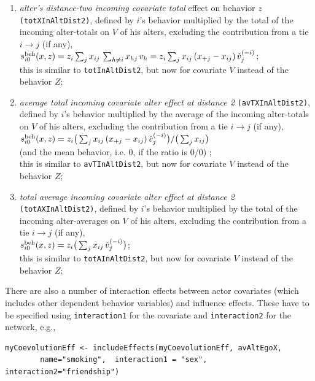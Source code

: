 \documentclass[a4paper,fleqn,11pt]{article}
\newcommand{\+}{\, + \,}
\newcommand{\vit}{\theenumi}
\newcounter{savenumi}
\begin{document}
\begin{enumerate}
 \item {\em alter's distance-two incoming covariate total} effect on behavior $z$ \texttt{(totXInAltDist2)},
 defined by  $i$'s
 behavior multiplied by the total of the incoming alter-totals on $V$ of his alters,
 excluding the contribution from a tie $i \rightarrow j$ (if any),\\
 $s^{\rm beh}_{i\vit}(x, z) = z_i \sum_j x_{ij}\, \sum_{h \neq i} x_{hj}\,v_h =
         z_i \sum_j x_{ij}\, (x_{+j}- x_{ij}) \, \check v_j^{(-i)}  $;\\[0.5ex]
 this is similar to \texttt{totInAltDist2}, but now for covariate $V$
 instead of the behavior $Z$;

 \item {\em average total incoming covariate alter effect at distance 2} \texttt{(avTXInAltDist2)},
 defined by  $i$'s
 behavior multiplied by the average of the incoming alter-totals on $V$ of his alters,
 excluding the contribution from a tie $i \rightarrow j$ (if any),\\[0.3ex]
 $s^{\rm beh}_{i\vit}(x, z) =  z_i \big( \sum_j x_{ij}\,(x_{+j}- x_{ij}) \, \check v_j^{(-i)} \big)
                                / \big (\sum_j x_{ij}\big)  $\\[0.5ex]
 (and the mean behavior, i.e. $0$, if the ratio is 0/0) ;\\
 this is similar to \texttt{avTInAltDist2}, but now for covariate $V$
 instead of the behavior $Z$;

 \item {\em total average incoming covariate alter effect at distance 2} \texttt{(totAXInAltDist2)},
 defined by  $i$'s
 behavior multiplied by the total of the incoming alter-averages on $V$ of his alters,
 excluding the contribution from a tie $i \rightarrow j$ (if any), \\[0.3ex]
 $s^{\rm beh}_{i\vit}(x, z) =  z_i \big( \sum_j x_{ij}\, \check v_j^{(-i)} \big) $;\\[0.5ex]
 this is similar to \texttt{totAInAltDist2}, but now for covariate $V$
 instead of the behavior $Z$;

\setcounter{savenumi}{\value{enumi}}
\end{enumerate}
There are also a number of interaction effects between actor covariates
(which includes other dependent behavior variables) and influence effects.
These have to be specified using \texttt{interaction1} for the covariate
and \texttt{interaction2} for the network, e.g.,
\begin{verbatim}
myCoevolutionEff <- includeEffects(myCoevolutionEff, avAltEgoX,
        name="smoking",  interaction1 = "sex", interaction2="friendship")
\end{verbatim}
\end{document}
